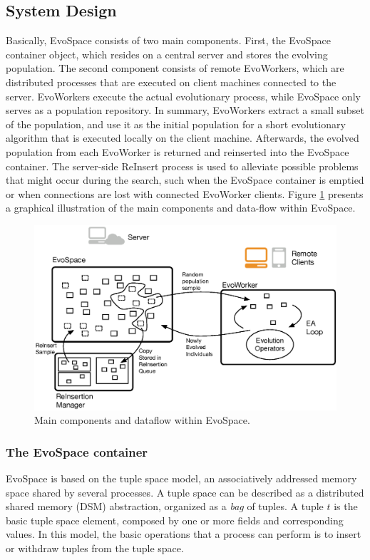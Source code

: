\subsection{System Design}
Basically, EvoSpace consists of two main components.
First, the EvoSpace container object, which resides on a central server and stores the evolving population.
The second component consists of remote EvoWorkers, which are distributed processes that are executed on client machines connected to the server.
EvoWorkers execute the actual evolutionary process, while EvoSpace only serves as a population repository.
In summary, EvoWorkers extract a small subset of the population, and use it as
the initial population for a short evolutionary algorithm that is executed
locally on the client machine. Afterwards, the evolved population from each EvoWorker is returned and reinserted into the EvoSpace container.
The server-side ReInsert process is used to alleviate possible problems that might occur during the search, such when the EvoSpace container
is emptied or when connections are lost with connected EvoWorker clients.
Figure \ref{fig:evo} presents a graphical illustration of the main components and data-flow within EvoSpace.

\begin{figure}[t]
    \centering
        \includegraphics[width=12cm]{evospaceExample.eps}
    \caption{Main components and dataflow within EvoSpace.}
    \label{fig:evo}
\end{figure}

\subsubsection{The EvoSpace container}
EvoSpace is based on the tuple space model, an associatively addressed memory space shared by several processes.
A tuple space can be described as a distributed shared memory (DSM) abstraction, organized as a \emph{bag} of tuples.
A tuple $t$ is the basic tuple space element, composed by one or more fields and corresponding values.
In this model, the basic operations that a process can perform is to insert or withdraw tuples from the tuple space.

